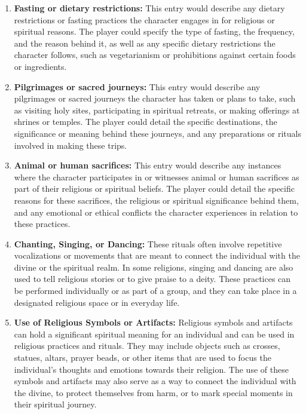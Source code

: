 \documentclass[12pt]{book}
\begin{document}
\begin{enumerate}
    \item \textbf{Fasting or dietary restrictions:}
    This entry would describe any dietary restrictions or fasting practices the character engages in for religious or spiritual reasons. The player could specify the type of fasting, the frequency, and the reason behind it, as well as any specific dietary restrictions the character follows, such as vegetarianism or prohibitions against certain foods or ingredients.
    
    \item \textbf{Pilgrimages or sacred journeys:}
    This entry would describe any pilgrimages or sacred journeys the character has taken or plans to take, such as visiting holy sites, participating in spiritual retreats, or making offerings at shrines or temples. The player could detail the specific destinations, the significance or meaning behind these journeys, and any preparations or rituals involved in making these trips.

    \item \textbf{Animal or human sacrifices:}
    This entry would describe any instances where the character participates in or witnesses animal or human sacrifices as part of their religious or spiritual beliefs. The player could detail the specific reasons for these sacrifices, the religious or spiritual significance behind them, and any emotional or ethical conflicts the character experiences in relation to these practices.

    \item \textbf{Chanting, Singing, or Dancing:}
    These rituals often involve repetitive vocalizations or movements that are meant to connect the individual with the divine or the spiritual realm. In some religions, singing and dancing are also used to tell religious stories or to give praise to a deity. These practices can be performed individually or as part of a group, and they can take place in a designated religious space or in everyday life.

    \item \textbf{Use of Religious Symbols or Artifacts:}
    Religious symbols and artifacts can hold a significant spiritual meaning for an individual and can be used in religious practices and rituals. They may include objects such as crosses, statues, altars, prayer beads, or other items that are used to focus the individual's thoughts and emotions towards their religion. The use of these symbols and artifacts may also serve as a way to connect the individual with the divine, to protect themselves from harm, or to mark special moments in their spiritual journey.
    

\end{enumerate}
\end{document}
